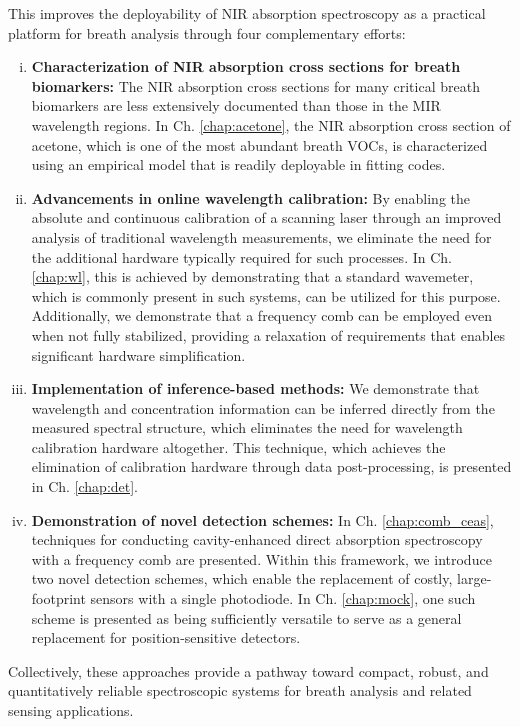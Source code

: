\documentclass[12pt]{report}
\begin{document}
	This improves the deployability of NIR absorption spectroscopy as a practical platform for breath analysis through four complementary efforts:
	\begin{enumerate}[(i)]
		\item \textbf{Characterization of NIR absorption cross sections for breath biomarkers:} The NIR absorption cross sections for many critical breath biomarkers are less extensively documented than those in the MIR wavelength regions. In Ch. \ref{chap:acetone}, the NIR absorption cross section of acetone, which is one of the most abundant breath VOCs, is characterized using an empirical model that is readily deployable in fitting codes.
		\item \textbf{Advancements in online wavelength calibration:} By enabling the absolute and continuous calibration of a scanning laser through an improved analysis of traditional wavelength measurements, we eliminate the need for the additional hardware typically required for such processes. In Ch. \ref{chap:wl}, this is achieved by demonstrating that a standard wavemeter, which is commonly present in such systems, can be utilized for this purpose. Additionally, we demonstrate that a frequency comb can be employed even when not fully stabilized, providing a relaxation of requirements that enables significant hardware simplification.
		\item \textbf{Implementation of inference-based methods:} We demonstrate that wavelength and concentration information can be inferred directly from the measured spectral structure, which eliminates the need for wavelength calibration hardware altogether. This technique, which achieves the elimination of calibration hardware through data post-processing, is presented in Ch. \ref{chap:det}.
		\item \textbf{Demonstration of novel detection schemes:} In Ch. \ref{chap:comb_ceas}, techniques for conducting cavity-enhanced direct absorption spectroscopy with a frequency comb are presented. Within this framework, we introduce two novel detection schemes, which enable the replacement of costly, large-footprint sensors with a single photodiode. In Ch. \ref{chap:mock}, one such scheme is presented as being sufficiently versatile to serve as a general replacement for position-sensitive detectors.
	\end{enumerate}
	Collectively, these approaches provide a pathway toward compact, robust, and quantitatively reliable spectroscopic systems for breath analysis and related sensing applications.
	
\end{document}
